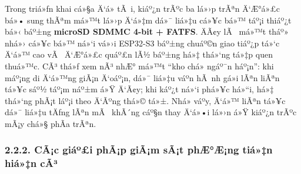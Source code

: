 \documentclass[a4paper]{extarticle}
\begin{document}
Trong triá»ƒn khai cá»§a Ä‘á» tÃ i, kiáº¿n trÃºc ba lá»›p trÃªn Ä‘Æ°á»£c bá»• sung thÃªm má»™t
lá»›p Ä‘á»‡m dá»¯ liá»‡u cá»¥c bá»™ táº¡i thiáº¿t bá»‹ báº±ng \textbf{microSD SDMMC 4-bit +
FATFS}. ÄÃ¢y lÃ  má»™t tháº» nhá»› cá»¥c bá»™ ná»‘i vá»›i ESP32-S3 báº±ng chuáº©n giao tiáº¿p
tá»‘c Ä‘á»™ cao vÃ  Ä‘Æ°á»£c quáº£n lÃ½ báº±ng há»‡ thá»‘ng tá»‡p quen thuá»™c. CÃ³ thá»ƒ xem nÃ³
nhÆ° má»™t ``kho chá» ngáº¯n háº¡n'': khi máº¡ng di Ä‘á»™ng giÃ¡n Ä‘oáº¡n, dá»¯ liá»‡u váº­n
hÃ nh gá»­i lÃªn liÃªn tá»¥c sáº½ táº¡m náº±m á»Ÿ Ä‘Ã¢y; khi káº¿t ná»‘i phá»¥c há»“i, há»‡ thá»‘ng
phÃ¡t láº¡i theo Ä‘Ãºng thá»© tá»±. Nhá» váº­y, Ä‘á»™ liÃªn tá»¥c dá»¯ liá»‡u tÄƒng lÃªn mÃ 
khÃ´ng cáº§n thay Ä‘á»•i lá»›n á»Ÿ kiáº¿n trÃºc mÃ¡y chá»§ phÃ­a trÃªn.

\subsubsection{2.2.2. CÃ¡c giáº£i phÃ¡p giÃ¡m sÃ¡t phÆ°Æ¡ng tiá»‡n hiá»‡n
cÃ³}\label{222-cuxe1c-giux1ea3i-phuxe1p-giuxe1m-suxe1t-phux1b0ux1a1ng-tiux1ec7n-hiux1ec7n-cuxf3}
\end{document}
